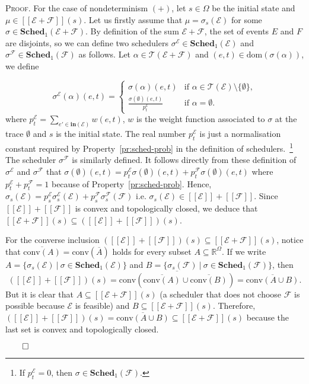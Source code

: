 \documentclass[review]{elsart}
\newenvironment{proof}{\par
\noindent
\textsc{Proof. }
\noindent}{\hfill\(\qed\)}
\newcommand{\Real}{{\mathbb R}}
\newcommand{\conv}{\mathrm{conv}}
\newcommand{\dom}{\mathrm{dom}}
\newcommand{\EE}{\mathcal{E}}
\newcommand{\FF}{\mathcal{F}}
\newcommand{\TT}{\mathcal{T}}
\newcommand{\init}{\mathbf{in}}
\newcommand{\sched}{\mathbf{Sched}}
\newcommand{\sem}[1]{[\![#1]\!]}
\begin{document}
\begin{proof}
For the case of nondeterminism $(+)$, let $s{\in}\Omega$ be the initial state and $\mu{\in}\sem{\EE{+}\FF}(s)$. Let us firstly assume that $\mu {=} \sigma_s(\EE)$ for some $\sigma{\in}\sched_1(\EE{+}\FF)$. By definition of the sum $\EE{+}\FF$, the set of events $E$ and $F$ are disjoints, so we can define two schedulers $\sigma^\EE{\in}\sched_1(\EE)$ and $\sigma^\FF{\in}\sched_1(\FF)$ as follows. Let $\alpha{\in}\TT(\EE{+}\FF)$ and $(e,t){\in}\dom(\sigma(\alpha))$, we define

\begin{displaymath}
\sigma^\EE(\alpha)(e,t) = \begin{cases}
\sigma(\alpha)(e,t) & \textrm{if }\alpha{\in}\TT(\EE){\setminus}\{\emptyset\},\\
\frac{\sigma(\emptyset)(e,t)}{p^\EE_t} & \textrm{if } \alpha {=} \emptyset.
\end{cases}
\end{displaymath} 
where $p^\EE_t {=} \sum_{e'{\in}\init(\EE)}w(e,t)$, $w$ is the weight function associated to $\sigma$ at the trace $\emptyset$ and $s$ is the initial state. The real number $p^\EE_t$ is just a normalisation constant required by Property~\ref{pr:sched-prob} in the definition of schedulers.~\footnote{If $p^\EE_t {=} 0$, then $\sigma{\in}\sched_1(\FF)$.} The scheduler $\sigma^\FF$ is similarly defined. It follows directly from these definition of $\sigma^\EE$ and $\sigma^\FF$ that $\sigma(\emptyset)(e,t) {=} p^\EE_t\sigma(\emptyset)(e,t) {+} p^{\FF}_t\sigma(\emptyset)(e,t)$ where $p^\EE_t {+} p^\FF_t {=} 1$ because of Property~\ref{pr:sched-prob}. Hence, $\sigma_s(\EE) {=} p^\EE_s\sigma_s^\EE(\EE) {+} p^{\FF}_s\sigma^{\FF}_s(\FF)$ i.e. $\sigma_s(\EE){\in}\sem{\EE} {+} \sem{\FF}$. Since $\sem{\EE} {+} \sem{\FF}$ is convex and topologically closed, we deduce that $\sem{\EE {+} \FF}(s)\subseteq(\sem{\EE}{+}\sem{\FF})(s)$. 

For the converse inclusion $(\sem{\EE}{+}\sem{\FF})(s){\subseteq}\sem{\EE {+} \FF}(s)$, notice that $\overline{\conv(A)} = \conv(\overline{A})$ holds for every subset $A{\subseteq}\Real^\Omega$. If we write $A {=} \{\sigma_s(\EE) \ | \ \sigma{\in}\sched_1(\EE)\}$ and $B {=} \{\sigma_s(\FF) \ | \ \sigma{\in}\sched_1(\FF)\}$, then 
\[
	(\sem{\EE}{+}\sem{\FF})(s) = \overline{\conv(\overline{\conv(A)}{\cup}\overline{\conv(B)})} = \overline{\conv(A{\cup} B)}.
\]
But it is clear that $A{\subseteq}\sem{\EE{+}\FF}(s)$ (a scheduler that does not choose $\FF$ is possible because $\EE$ is feasible) and $B{\subseteq}\sem{\EE{+}\FF}(s)$. Therefore, $(\sem{\EE}{+}\sem{\FF})(s) = \overline{\conv(A{\cup} B)}{\subseteq} \sem{\EE{+}\FF}(s)$ because the last set is convex and topologically closed.



\end{proof}
\end{document}
